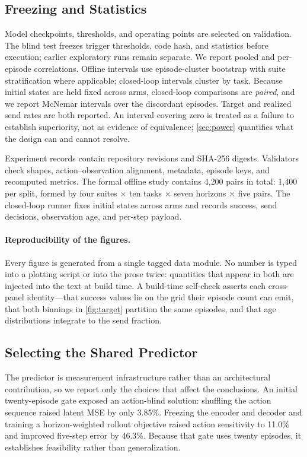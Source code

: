 \documentclass[sigconf,10pt,anonymous,review]{acmart}
\begin{document}
\subsection{Freezing and Statistics}
Model checkpoints, thresholds, and operating points are selected on
validation. The blind test freezes trigger thresholds, code hash, and
statistics before execution; earlier exploratory runs remain separate. We
report pooled and per-episode correlations. Offline intervals use
episode-cluster bootstrap with suite stratification where applicable;
closed-loop intervals cluster by task. Because initial states are held fixed
across arms, closed-loop comparisons are \emph{paired}, and we report McNemar
intervals over the discordant episodes. Target and realized send rates are
both reported. An interval covering zero is treated as a failure to establish
superiority, not as evidence of equivalence; \cref{sec:power} quantifies what
the design can and cannot resolve.

Experiment records contain repository revisions and SHA-256 digests.
Validators check shapes, action--observation alignment, metadata, episode
keys, and recomputed metrics. The formal offline study contains 4{,}200 pairs
in total: 1{,}400 per split, formed by four suites $\times$ ten tasks
$\times$ seven horizons $\times$ five pairs. The closed-loop runner fixes initial states across arms and records success,
send decisions, observation age, and per-step payload.

\paragraph{Reproducibility of the figures.}
Every figure is generated from a single tagged data module. No
number is typed into a plotting script or into the prose twice: quantities
that appear in both are injected into the text at build time. A build-time
self-check asserts each cross-panel identity---that success values lie on the
grid their episode count can emit, that both binnings in
\cref{fig:target} partition the same episodes, and that age distributions integrate to the send fraction.

\subsection{Selecting the Shared Predictor}

The predictor is measurement infrastructure rather than an architectural
contribution, so we report only the choices that affect the conclusions. An
initial twenty-episode gate exposed an action-blind solution: shuffling the
action sequence raised latent MSE by only 3.85\%. Freezing the encoder and
decoder and training a horizon-weighted rollout objective raised action sensitivity to 11.0\% and improved five-step error by 46.3\%.
Because that gate uses twenty episodes, it establishes feasibility rather than
generalization.
\end{document}
